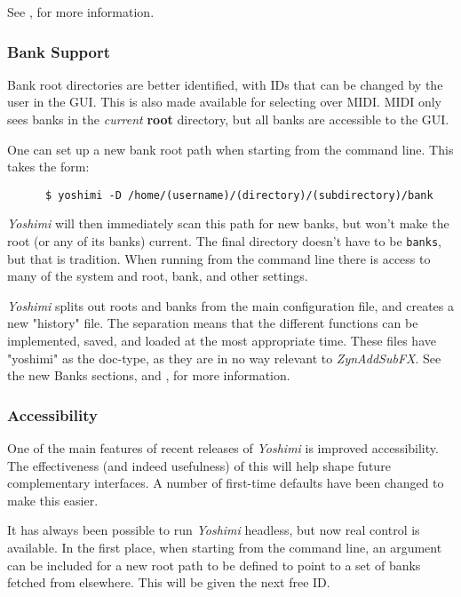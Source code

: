 \documentclass[
 11pt,
 twoside,
 a4paper,
 final                                 %
]{article}
\begin{document}
   See , for more information.

\subsubsection{Bank Support}
\label{subsubsec:new_features_bank_support}

   Bank root directories are better identified, with IDs that can be changed by
   the user in the GUI. This is also made available for selecting over MIDI.
   MIDI only sees banks in the \textsl{current}
   \textbf{root} directory, but all banks are accessible to the GUI.

   One can set up a new bank root path when starting from the
   command line. This takes the form:

   \begin{verbatim}
      $ yoshimi -D /home/(username)/(directory)/(subdirectory)/bank
   \end{verbatim}

   \textsl{Yoshimi} will then immediately scan this path for new banks, but
   won't make the root (or any of its banks) current. The final directory
   doesn't have to be \texttt{banks}, but that is tradition.
   When running from the command line there is access to many
   of the system and root, bank, and other settings.

	\textsl{Yoshimi} splits out roots and banks from the main configuration
	file, and creates a new "history" file. The separation means that the
	different functions can be implemented, saved, and loaded at the most
   appropriate time. These files have
   "yoshimi" as the doc-type, as they are in no way relevant to
   \textsl{ZynAddSubFX}.
   See the new Banks sections,
   and
   ,
   for more information.

\subsubsection{Accessibility}
\label{subsubsec:new_features_accessibility}

   One of the main features of recent releases of \textsl{Yoshimi} is improved
   accessibility. The effectiveness (and indeed usefulness) of this will help
   shape future complementary interfaces. A number of first-time defaults
   have been changed to make this easier.

   It has always been possible to run \textsl{Yoshimi} headless, but now real
   control is available. In the first place, when starting from the command
   line, an argument can be included for a new root path to be defined to point
   to a set of banks fetched from elsewhere. This will be given the next free
   ID.
\end{document}
